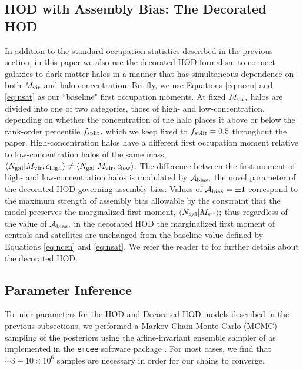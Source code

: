 \documentclass[usenatbib,usegraphicx,letterpaper]{mn2e}
\newcommand{\mvir}{M_{\rm vir}}
\newcommand{\ngal}{N_{\rm gal}}
\newcommand{\abias}{\mathcal{A}_{\rm bias}}
\begin{document}
\subsection{HOD with Assembly Bias: The Decorated HOD}
\label{subsection:decorated}

In addition to the standard occupation statistics described in the
previous section, in this paper we also use the decorated HOD
formalism to connect galaxies to dark matter halos in a manner that
has simultaneous dependence on both $\mvir$ and halo
concentration. Briefly, we use Equations \ref{eq:ncen} and
\ref{eq:nsat} as our ``baseline" first occupation moments. At fixed
$\mvir,$ halos are divided into one of two categories, those of high-
and low-concentration, depending on whether the concentration of the
halo places it above or below the rank-order percentile $f_{\rm
  split},$ which we keep fixed to $f_{\rm split}=0.5$ throughout the
paper. High-concentration halos have a different first occupation
moment relative to low-concentration halos of the same mass,
$\langle\ngal|\mvir, c_{\rm high}\rangle \neq \langle\ngal|\mvir,
c_{\rm low}\rangle.$ The difference between the first moment of high-
and low-concentration halos is modulated by $\abias,$ the novel
parameter of the decorated HOD governing assembly bias. Values of
$\abias=\pm1$ correspond to the maximum strength of assembly bias
allowable by the constraint that the model preserves the marginalized
first moment, $\langle\ngal|\mvir\rangle;$ thus regardless of the
value of $\abias,$ in the decorated HOD the marginalized first moment
of centrals and satellites are unchanged from the baseline value
defined by Equations \ref{eq:ncen} and \ref{eq:nsat}. We refer the
reader to \citet{hearin_etal16} for further details about the
decorated HOD.

\subsection{Parameter Inference}
\label{subsection:mcmc}

To infer parameters for the HOD and Decorated HOD models described in the previous subsections, 
we performed a Markov Chain Monte Carlo (MCMC) sampling of the posteriors using the 
affine-invariant ensemble sampler of \citet{goodman_weare10} as implemented in the 
{\tt emcee} software package \citep{foreman-mackey_etal13}. For most cases, we find that 
$\sim 3-10 \times 10^{6}$ samples are necessary in order for our chains to converge. 
\end{document}
